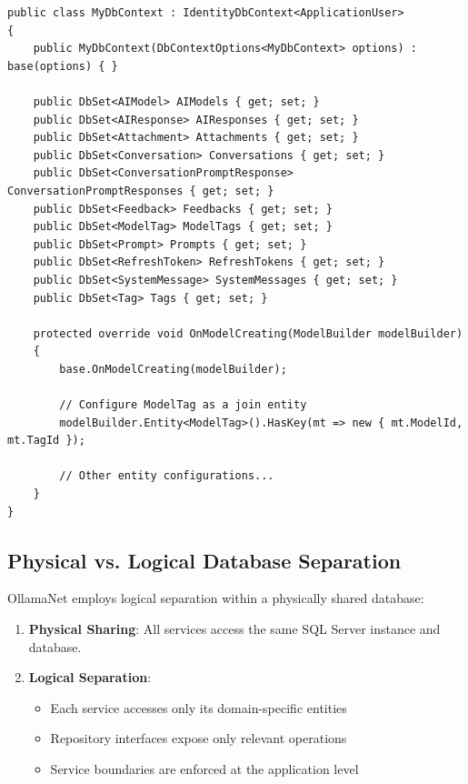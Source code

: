 \begin{verbatim}
public class MyDbContext : IdentityDbContext<ApplicationUser>
{
    public MyDbContext(DbContextOptions<MyDbContext> options) : base(options) { }

    public DbSet<AIModel> AIModels { get; set; }
    public DbSet<AIResponse> AIResponses { get; set; }
    public DbSet<Attachment> Attachments { get; set; }
    public DbSet<Conversation> Conversations { get; set; }
    public DbSet<ConversationPromptResponse> ConversationPromptResponses { get; set; }
    public DbSet<Feedback> Feedbacks { get; set; }
    public DbSet<ModelTag> ModelTags { get; set; }
    public DbSet<Prompt> Prompts { get; set; }
    public DbSet<RefreshToken> RefreshTokens { get; set; }
    public DbSet<SystemMessage> SystemMessages { get; set; }
    public DbSet<Tag> Tags { get; set; }

    protected override void OnModelCreating(ModelBuilder modelBuilder)
    {
        base.OnModelCreating(modelBuilder);

        // Configure ModelTag as a join entity
        modelBuilder.Entity<ModelTag>().HasKey(mt => new { mt.ModelId, mt.TagId });

        // Other entity configurations...
    }
}
\end{verbatim}

\subsection{Physical vs. Logical Database Separation}

OllamaNet employs logical separation within a physically shared database:

\begin{enumerate}
   \item \textbf{Physical Sharing}: All services access the same SQL Server instance and database.

   \item \textbf{Logical Separation}:
   \begin{itemize}
      \item Each service accesses only its domain-specific entities
      \item Repository interfaces expose only relevant operations
      \item Service boundaries are enforced at the application level
   \end{itemize}
\end{enumerate}

